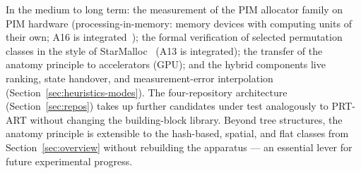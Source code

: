 \begin{nurkurz}
\medskip
In the medium to long term: the measurement of the PIM allocator family on PIM hardware
(processing-in-memory: memory devices with computing units of their own; A16 is
integrated~\cite{pimmalloc2026}); the formal verification of selected permutation classes in the style of
StarMalloc~\cite{reitz2024starmalloc} (A13 is integrated); the transfer of the anatomy principle to
accelerators (GPU); and the hybrid components live ranking, state handover, and measurement-error
interpolation (Section~\ref{sec:heuristics-modes}). The four-repository architecture
(Section~\ref{sec:repos}) takes up further candidates under test analogously to PRT-ART without changing
the building-block library. Beyond tree structures, the anatomy principle is extensible to the hash-based,
spatial, and flat classes from Section~\ref{sec:overview} without rebuilding the apparatus --- an
essential lever for future experimental progress.
\end{nurkurz}
